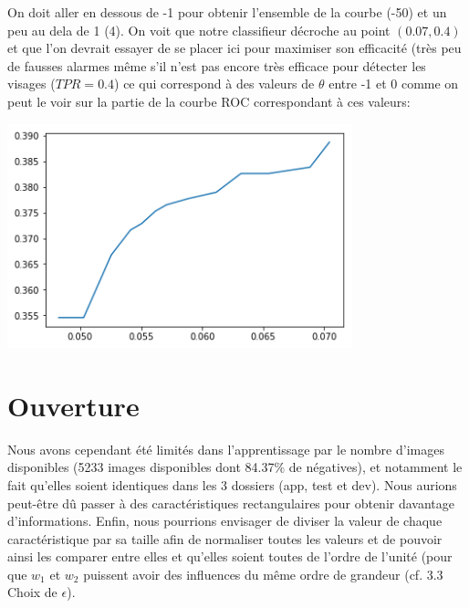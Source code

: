 \documentclass[a4paper,11pt]{article}
\begin{document}
On doit aller en dessous de -1 pour obtenir l'ensemble de la courbe (-50) et un peu au dela de 1 (4). On voit que notre classifieur décroche au point $(0.07, 0.4)$ et que l'on devrait essayer de se placer ici pour maximiser son efficacité (très peu de fausses alarmes même s'il n'est pas encore très efficace pour détecter les visages ($TPR = 0.4$) ce qui correspond à des valeurs de $\theta$ entre -1 et 0 comme on peut le voir sur la partie de la courbe ROC correspondant à ces valeurs:
\begin{center}
  \includegraphics[width=10cm]{"ROC zoom"}
\end{center}
\section{Ouverture}
Nous avons cependant été limités dans l’apprentissage par le nombre d’images disponibles (5233 images disponibles dont 84.37$\%$ de négatives), et notamment le fait qu’elles soient identiques dans les 3 dossiers (app, test et dev). Nous aurions peut-être dû passer à des caractéristiques rectangulaires pour obtenir davantage d’informations. Enfin, nous pourrions envisager de diviser la valeur de chaque caractéristique par sa taille afin de normaliser toutes les valeurs et de pouvoir ainsi les comparer entre elles et qu’elles soient toutes de l’ordre de l’unité (pour que $w_1$ et $w_2$ puissent avoir des influences du même ordre de grandeur (cf. 3.3 Choix de $\epsilon$).
\end{document}
